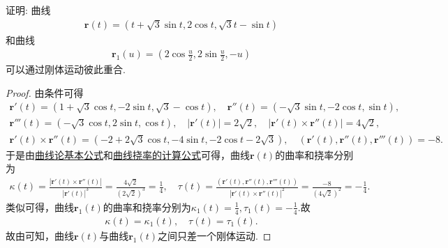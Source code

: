 \documentclass[../../main.tex]{subfiles}%
\begin{document}
\begin{example}
证明: 曲线
\begin{align*}
\bm{r}(t) = (t + \sqrt{3} \sin t, 2 \cos t, \sqrt{3}t - \sin t)
\end{align*}
和曲线
\begin{align*}
\bm{r}_1(u) = \left(2 \cos \frac{u}{2}, 2 \sin \frac{u}{2}, -u\right)
\end{align*}
可以通过刚体运动彼此重合.
\end{example}
\begin{proof}
由条件可得
\begin{gather*}
\boldsymbol{r}'(t)=\left( 1+\sqrt{3}\cos t,-2\sin t,\sqrt{3}-\cos t \right) ,\quad \boldsymbol{r}'' (t)=\left( -\sqrt{3}\sin t,-2\cos t,\sin t \right) ,
\\
\boldsymbol{r}''' (t)=\left( -\sqrt{3}\cos t,2\sin t,\cos t \right) ,\quad \left| \boldsymbol{r}'(t) \right|=2\sqrt{2},\quad \left| \boldsymbol{r}'(t)\times \boldsymbol{r}'' (t) \right|=4\sqrt{2},
\\
\boldsymbol{r}'(t)\times \boldsymbol{r}'' (t)=\left( -2+2\sqrt{3}\cos t,-4\sin t,-2\cos t-2\sqrt{3} \right) ,\quad (\boldsymbol{r}'(t),\boldsymbol{r}'' (t),\boldsymbol{r}''' (t))=-8.
\end{gather*}
于是由\hyperref[theorem:曲线论基本公式]{曲线论基本公式}和\hyperref[theorem:微分几何-曲线挠率的计算公式]{曲线挠率的计算公式}可得，曲线$\bm{r}(t)$的曲率和挠率分别为
\begin{align*}
\kappa(t)=\frac{\left|\bm{r}'(t)\times\bm{r}''(t)\right|}{\left|\bm{r}'(t)\right|^3}=\frac{4\sqrt{2}}{(2\sqrt{2})^3}=\frac{1}{4},\quad \tau(t)=\frac{(\bm{r}'(t),\bm{r}''(t),\bm{r}'''(t))}{\left|\bm{r}'(t)\times\bm{r}''(t)\right|^2}=\frac{-8}{(4\sqrt{2})^2}=-\frac{1}{4}.
\end{align*}
类似可得，曲线$\bm{r}_1(t)$的曲率和挠率分别为$\kappa_1(t)=\frac{1}{4},\tau_1(t)=-\frac{1}{4}.$故
\begin{align*}
\kappa(t)=\kappa_1(t),\quad \tau(t)=\tau_1(t).
\end{align*}
故由可知，曲线$\bm{r}(t)$与曲线$\bm{r}_1(t)$之间只差一个刚体运动.
\end{proof}
\end{document}
